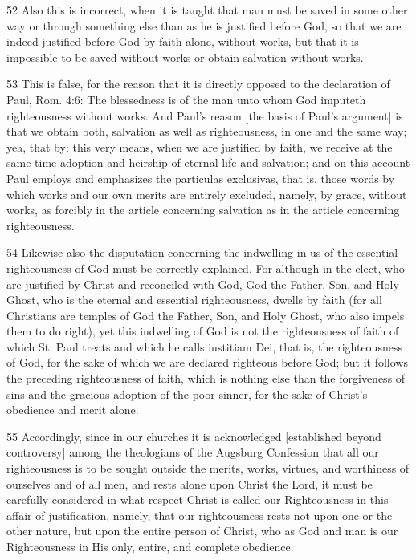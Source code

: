 52 Also this is incorrect, when it is taught that man must be saved in some other way or through something else than as he is justified before God, so that we are indeed justified before God by faith alone, without works, but that it is impossible to be saved without works or obtain salvation without works.

53 This is false, for the reason that it is directly opposed to the declaration of Paul, Rom. 4:6: The blessedness is of the man unto whom God imputeth righteousness without works. And Paul’s reason [the basis of Paul’s argument] is that we obtain both, salvation as well as righteousness, in one and the same way; yea, that by: this very means, when we are justified by faith, we receive at the same time adoption and heirship of eternal life and salvation; and on this account Paul employs and emphasizes the particulas exclusivas, that is, those words by which works and our own merits are entirely excluded, namely, by grace, without works, as forcibly in the article concerning salvation as in the article concerning righteousness.

54 Likewise also the disputation concerning the indwelling in us of the essential righteousness of God must be correctly explained. For although in the elect, who are justified by Christ and reconciled with God, God the Father, Son, and Holy Ghost, who is the eternal and essential righteousness, dwells by faith (for all Christians are temples of God the Father, Son, and Holy Ghost, who also impels them to do right), yet this indwelling of God is not the righteousness of faith of which St. Paul treats and which he calls iustitiam Dei, that is, the righteousness of God, for the sake of which we are declared righteous before God; but it follows the preceding righteousness of faith, which is nothing else than the forgiveness of sins and the gracious adoption of the poor sinner, for the sake of Christ’s obedience and merit alone.

55 Accordingly, since in our churches it is acknowledged [established beyond controversy] among the theologians of the Augsburg Confession that all our righteousness is to be sought outside the merits, works, virtues, and worthiness of ourselves and of all men, and rests alone upon Christ the Lord, it must be carefully considered in what respect Christ is called our Righteousness in this affair of justification, namely, that our righteousness rests not upon one or the other nature, but upon the entire person of Christ, who as God and man is our Righteousness in His only, entire, and complete obedience.

